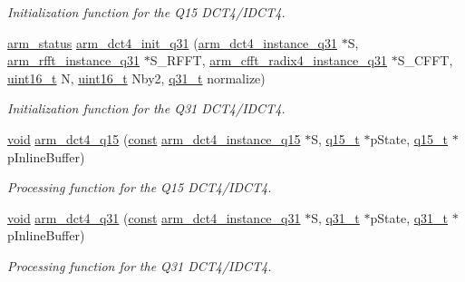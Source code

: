 \begin{DoxyCompactItemize}
\begin{DoxyCompactList}\small\item\em Initialization function for the Q15 D\-C\-T4/\-I\-D\-C\-T4. \end{DoxyCompactList}\item 
\hyperlink{arm__math_8h_a5e459c6409dfcd2927bb8a57491d7cf6}{arm\-\_\-status} \hyperlink{group___d_c_t4___i_d_c_t4_ga631bb59c7c97c814ff7147ecba6a716a}{arm\-\_\-dct4\-\_\-init\-\_\-q31} (\hyperlink{structarm__dct4__instance__q31}{arm\-\_\-dct4\-\_\-instance\-\_\-q31} $\ast$S, \hyperlink{structarm__rfft__instance__q31}{arm\-\_\-rfft\-\_\-instance\-\_\-q31} $\ast$S\-\_\-\-R\-F\-F\-T, \hyperlink{structarm__cfft__radix4__instance__q31}{arm\-\_\-cfft\-\_\-radix4\-\_\-instance\-\_\-q31} $\ast$S\-\_\-\-C\-F\-F\-T, \hyperlink{stdint_8h_a273cf69d639a59973b6019625df33e30}{uint16\-\_\-t} N, \hyperlink{stdint_8h_a273cf69d639a59973b6019625df33e30}{uint16\-\_\-t} Nby2, \hyperlink{arm__math_8h_adc89a3547f5324b7b3b95adec3806bc0}{q31\-\_\-t} normalize)
\begin{DoxyCompactList}\small\item\em Initialization function for the Q31 D\-C\-T4/\-I\-D\-C\-T4. \end{DoxyCompactList}\item 
\hyperlink{group___n_a_m_e_ga18028b8badbf1ea7e704ccac3c488e82}{void} \hyperlink{group___d_c_t4___i_d_c_t4_ga114cb9635059f678df291fcc887aaf2b}{arm\-\_\-dct4\-\_\-q15} (\hyperlink{group___n_a_m_e_ga7ae6d0e43244213b34de2c2b9aa30da6}{const} \hyperlink{structarm__dct4__instance__q15}{arm\-\_\-dct4\-\_\-instance\-\_\-q15} $\ast$S, \hyperlink{arm__math_8h_ab5a8fb21a5b3b983d5f54f31614052ea}{q15\-\_\-t} $\ast$p\-State, \hyperlink{arm__math_8h_ab5a8fb21a5b3b983d5f54f31614052ea}{q15\-\_\-t} $\ast$p\-Inline\-Buffer)
\begin{DoxyCompactList}\small\item\em Processing function for the Q15 D\-C\-T4/\-I\-D\-C\-T4. \end{DoxyCompactList}\item 
\hyperlink{group___n_a_m_e_ga18028b8badbf1ea7e704ccac3c488e82}{void} \hyperlink{group___d_c_t4___i_d_c_t4_gad04d0baab6ed081d8e8afe02538eb80b}{arm\-\_\-dct4\-\_\-q31} (\hyperlink{group___n_a_m_e_ga7ae6d0e43244213b34de2c2b9aa30da6}{const} \hyperlink{structarm__dct4__instance__q31}{arm\-\_\-dct4\-\_\-instance\-\_\-q31} $\ast$S, \hyperlink{arm__math_8h_adc89a3547f5324b7b3b95adec3806bc0}{q31\-\_\-t} $\ast$p\-State, \hyperlink{arm__math_8h_adc89a3547f5324b7b3b95adec3806bc0}{q31\-\_\-t} $\ast$p\-Inline\-Buffer)
\begin{DoxyCompactList}\small\item\em Processing function for the Q31 D\-C\-T4/\-I\-D\-C\-T4. \end{DoxyCompactList}\end{DoxyCompactItemize}


